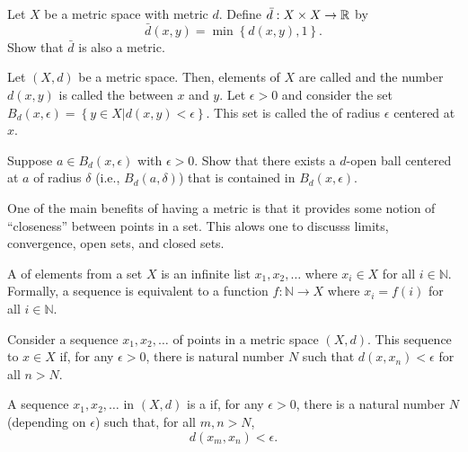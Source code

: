 \begin{problem} \label{problem:StandardBoundedMetric}
Let $X$ be a metric space with metric $d$.
Define $\bar{d} : X \times X \rightarrow \mathbb{R}$ by
\begin{equation*}
\bar{d} (x, y)
= \min \left\{ d (x, y), 1 \right\}.
\end{equation*}
Show that $\bar{d}$ is also a metric.
\end{problem}

Let $(X,d)$ be a metric space.
Then, elements of $X$ are called  and the number $d(x,y)$ is called the  between $x$ and $y$.
Let $\epsilon > 0$ and consider the set $B_d(x,\epsilon) = \left\{ y \in X | d(x,y) < \epsilon \right\}$.
This set is called the  of radius $\epsilon$ centered at $x$.

\begin{problem}
Suppose $a \in B_d(x, \epsilon)$ with $\epsilon > 0$.
Show that there exists a $d$-open ball centered at $a$ of radius $\delta$ (i.e., $B_d(a, \delta)$) that is contained in $B_d(x, \epsilon)$.
\end{problem}

One of the main benefits of having a metric is that it provides some notion of ``closeness'' between points in a set.
This alows one to discusss limits, convergence, open sets, and closed sets.

\begin{definition}
A  of elements from a set $X$ is an infinite list $x_1,x_2,\ldots$ where $x_i \in X$ for all $i\in \mathbb{N}$.
Formally, a sequence is equivalent to a function $f: \mathbb{N} \rightarrow X$ where $x_i = f(i)$ for all $i\in \mathbb{N}$.
\end{definition}

\begin{definition}
Consider a sequence $x_1, x_2, \ldots$ of points in a metric space $(X,d)$.
This sequence  to $x\in X$ if, for any $\epsilon >0$, there is natural number $N$ such that $d(x,x_n) < \epsilon$ for all $n>N$.
\end{definition}

\begin{definition}
A sequence $x_1,x_2,\ldots$ in $(X,d)$ is a  if, for any $\epsilon >0$, there is a natural number $N$ (depending on $\epsilon$) such that, for all $m,n > N$,
\begin{equation*}
d \left( x_m, x_n \right) < \epsilon.
\end{equation*}
\end{definition}

